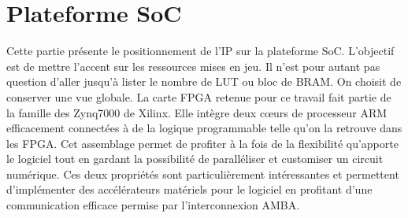 \section{Plateforme SoC}
Cette partie présente le positionnement de l'IP sur la plateforme SoC.
L'objectif est de mettre l'accent sur les ressources mises en jeu.
Il n'est pour autant pas question d'aller jusqu'à lister le nombre de LUT ou bloc de BRAM.
On choisit de conserver une vue globale.
La carte FPGA retenue pour ce travail fait partie de la famille des Zynq7000 de Xilinx.
Elle intègre deux cœurs de processeur ARM efficacement connectées à de la logique programmable telle qu'on la retrouve dans les FPGA.
Cet assemblage permet de profiter à la fois de la flexibilité qu'apporte le logiciel tout en gardant la possibilité de paralléliser et customiser un circuit numérique.
Ces deux propriétés sont particulièrement intéressantes et permettent d'implémenter des accélérateurs matériels pour le logiciel en profitant d'une communication efficace permise par l'interconnexion AMBA\mbox{\textregistered }.

